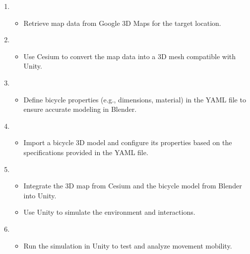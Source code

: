 \documentclass[letterpaper,10pt,english]{jupyterBook}
\begin{document}
\begin{enumerate}
%
\item {} 
\sphinxAtStartPar
{}
\begin{itemize}
\item {} 
\sphinxAtStartPar
Retrieve map data from Google 3D Maps for the target location.

\end{itemize}

\item {} 
\sphinxAtStartPar
{}
\begin{itemize}
\item {} 
\sphinxAtStartPar
Use Cesium to convert the map data into a 3D mesh compatible with Unity.

\end{itemize}

\item {} 
\sphinxAtStartPar
{}
\begin{itemize}
\item {} 
\sphinxAtStartPar
Define bicycle properties (e.g., dimensions, material) in the YAML file to ensure accurate modeling in Blender.

\end{itemize}

\item {} 
\sphinxAtStartPar
{}
\begin{itemize}
\item {} 
\sphinxAtStartPar
Import a bicycle 3D model and configure its properties based on the specifications provided in the YAML file.

\end{itemize}

\item {} 
\sphinxAtStartPar
{}
\begin{itemize}
\item {} 
\sphinxAtStartPar
Integrate the 3D map from Cesium and the bicycle model from Blender into Unity.

\item {} 
\sphinxAtStartPar
Use Unity to simulate the environment and interactions.

\end{itemize}

\item {} 
\sphinxAtStartPar
{}
\begin{itemize}
\item {} 
\sphinxAtStartPar
Run the simulation in Unity to test and analyze movement mobility.

\end{itemize}

\end{enumerate}
\end{document}
